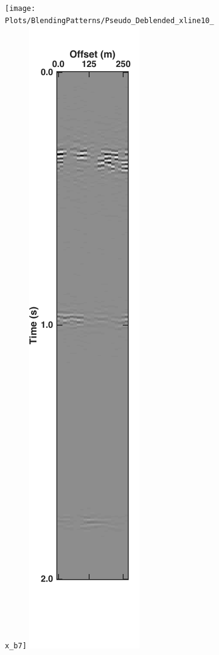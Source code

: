 \begin{figure}
\begin{subfigure}[t]{0.16\textwidth}
		\caption{}
		\label{fig:Ch-Results-Unbl-inline10}
	\end{subfigure}
	\centering
	\begin{subfigure}[t]{0.26\textwidth}
		\centering
		\texttt{[image: Plots/BlendingPatterns/Pseudo\_Deblended\_xline10\_x\_b7]}
		\includegraphics[height = 0.38\textheight]{Plots/BlendingPatterns/Deblended_xline10x}

\end{subfigure}
\end{figure}
